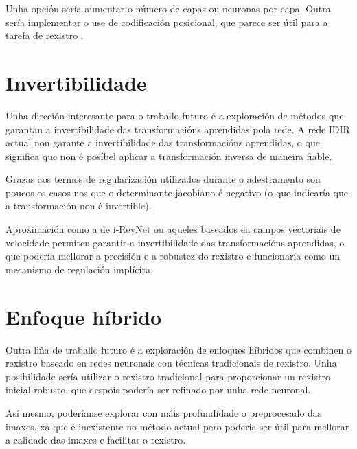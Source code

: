Unha opción sería aumentar o número de capas ou neuronas por capa. Outra sería implementar o use de codificación posicional, que parece ser útil para a tarefa de rexistro \cite{mueller2022instant}.

\section{Invertibilidade}
\label{sec:Invertibilidade}

Unha direción interesante para o traballo futuro é a exploración de métodos que garantan a invertibilidade das transformacións aprendidas pola rede.
A rede IDIR actual non garante a invertibilidade das transformacións aprendidas, o que significa que non é posíbel aplicar a transformación inversa de maneira fiable.

Grazas aos termos de regularización utilizados durante o adestramento son poucos os casos nos que o determinante jacobiano é negativo (o que indicaría que a transformación non é invertible).

Aproximación como a de i-RevNet \cite{jacobsen2018irevnetdeepinvertiblenetworks} ou aqueles baseados en campos vectoriais de velocidade \cite{sun2024medicalimageregistrationneural} permiten garantir a invertibilidade das transformacións aprendidas, o que podería mellorar a precisión e a robustez do rexistro e funcionaría como un mecanismo de regulación implícita.

\section{Enfoque híbrido}
\label{sec:Enfoque híbrido}

Outra liña de traballo futuro é a exploración de enfoques híbridos que combinen o rexistro baseado en redes neuronais con técnicas tradicionais de rexistro.
Unha posibilidade sería utilizar o rexistro tradicional para proporcionar un rexistro inicial robusto, que despois podería ser refinado por unha rede neuronal.

Así mesmo, poderíanse explorar con máis profundidade o preprocesado das imaxes, xa que é inexistente no método actual pero podería ser útil para mellorar a calidade das imaxes e facilitar o rexistro.